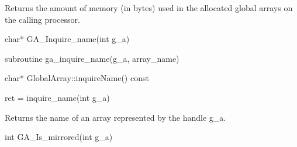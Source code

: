 \documentclass[12pt]{article}
\begin{document}
\begin{desc}

Returns the amount of memory (in bytes) used in the allocated global arrays on
the calling processor.

\end{desc}


\begin{capi}
\begin{ccode}
char* GA_Inquire_name(int g_a)
\end{ccode}
\begin{funcargs}
\end{funcargs}
\end{capi}

\begin{fapi}
\begin{fcode}
subroutine ga_inquire_name(g_a, array_name)
\end{fcode}
\begin{funcargs}
\end{funcargs}
\end{fapi}

\begin{cxxapi}
\begin{cxxcode}
char* GlobalArray::inquireName() const
\end{cxxcode}
\end{cxxapi}

\begin{pyapi}
\begin{pycode}
ret = inquire_name(int g_a)
\end{pycode}
\begin{funcargs}
\end{funcargs}
\end{pyapi}

\local

\begin{desc}

Returns the name of an array represented by the handle g_a.

\end{desc}


\begin{capi}
\begin{ccode}
int GA_Is_mirrored(int g_a)
\end{ccode}
\begin{funcargs}
\end{funcargs}
\end{capi}
\end{document}
